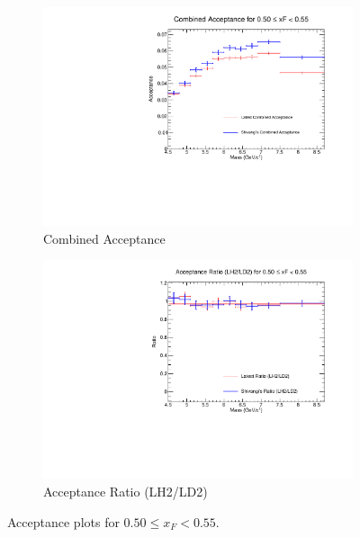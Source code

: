 \documentclass[11pt]{article}
\begin{document}
\begin{figure}[p]
\begin{subfigure}[b]{0.48\textwidth}
       \includegraphics[width=\linewidth]{./acceptancePlots/Combined_acceptance_xF_bin_10.pdf}
       \caption{Combined Acceptance}
    \end{subfigure}\hfill
    \begin{subfigure}[b]{0.48\textwidth}
       \includegraphics[width=\linewidth]{./acceptancePlots/Acceptance_ratio_xF_bin_10.pdf}
       \caption{Acceptance Ratio (LH2/LD2)}
    \end{subfigure}
    \caption{Acceptance plots for $0.50 \le x_F < 0.55$.}
\end{figure}
\end{document}
